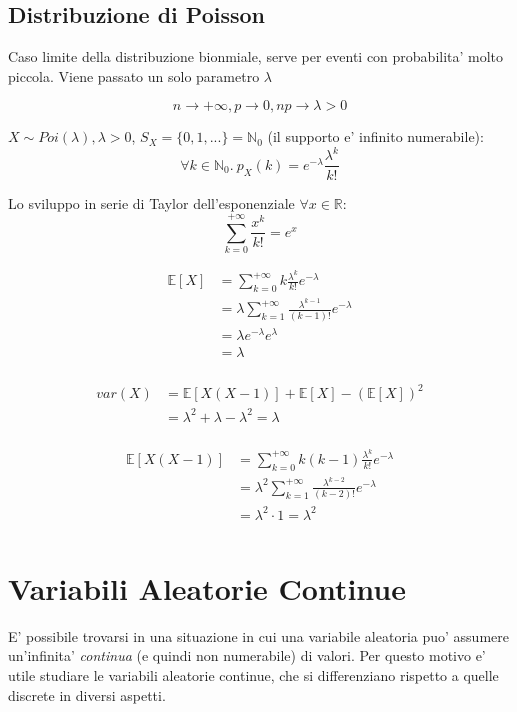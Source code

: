\subsection{Distribuzione di Poisson}
Caso limite della distribuzione bionmiale, serve per eventi con probabilita' molto piccola. Viene passato un solo parametro $ \lambda $

\[
n\to +\infty, p\to 0, np \to \lambda > 0
\]

$ X \sim Poi(\lambda), \lambda > 0 $, $ S_X = \{0,1,...\} = \mathbb{N}_0 $ (il supporto e' infinito numerabile):
\[
  \forall k \in \mathbb{N}_0.\ p_X(k) = e^{-\lambda}\frac{\lambda^{k}}{k!}
\]

Lo sviluppo in serie di Taylor dell'esponenziale $ \forall x \in \mathbb{R} $: 
\[
\sum_{k=0}^{+\infty} \frac{x^{k}}{k!} = e^{x}
\]

\begin{align*}
  \mathbb{E}[X] &= \sum_{k=0}^{+\infty} k \frac{\lambda^{k}}{k!}e^{-\lambda} \\
  &= \lambda\sum_{k=1}^{+\infty} \frac{\lambda^{k-1}}{(k-1)!}e^{-\lambda} \\
  &= \lambda e^{-\lambda} e^{\lambda} \\
  &= \lambda \\
\end{align*}

\begin{align*}
  var(X) &= \mathbb{E}[X(X-1)] + \mathbb{E}[X] - (\mathbb{E}[X])^2\\
  &= \lambda^2 + \lambda - \lambda^2 = \lambda \\
\end{align*}

\begin{align*}
  \mathbb{E}[X(X-1)] &= \sum_{k=0}^{+\infty} k(k-1) \frac{\lambda^{k}}{k!} e^{-\lambda}\\
  &= \lambda^2 \sum_{k=1}^{+\infty} \frac{\lambda^{k-2}}{(k-2)!}e^{-\lambda} \\
  &= \lambda^2 \cdot 1 = \lambda^2 \\
\end{align*}


\section{Variabili Aleatorie Continue}

E' possibile trovarsi in una situazione in cui una variabile aleatoria puo' assumere un'infinita' \textit{continua} (e quindi non numerabile) di valori. Per questo motivo e' utile studiare le variabili aleatorie continue, che si differenziano rispetto a quelle discrete in diversi aspetti.

